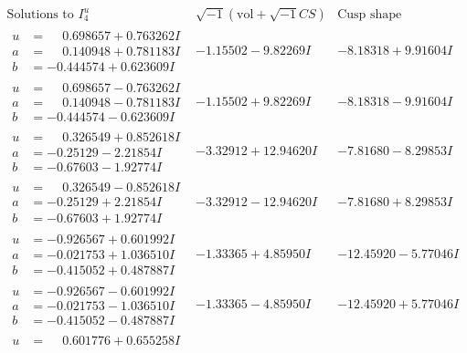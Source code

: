 \documentclass[1p]{elsarticle_modified}
\theoremstyle{definition}
\newcommand{\I}{\sqrt{-1}}
\begin{document}
$$\begin{array}{c|c|c}  
\text{Solutions to }I^u_{4}& \I (\text{vol} + \sqrt{-1}CS) & \text{Cusp shape}\\
 \hline 
\begin{aligned}
u &= \phantom{-}0.698657 + 0.763262 I \\
a &= \phantom{-}0.140948 + 0.781183 I \\
b &= -0.444574 + 0.623609 I\end{aligned}
 & -1.15502 - 9.82269 I & -8.18318 + 9.91604 I \\ \hline\begin{aligned}
u &= \phantom{-}0.698657 - 0.763262 I \\
a &= \phantom{-}0.140948 - 0.781183 I \\
b &= -0.444574 - 0.623609 I\end{aligned}
 & -1.15502 + 9.82269 I & -8.18318 - 9.91604 I \\ \hline\begin{aligned}
u &= \phantom{-}0.326549 + 0.852618 I \\
a &= -0.25129 - 2.21854 I \\
b &= -0.67603 - 1.92774 I\end{aligned}
 & -3.32912 + 12.94620 I & -7.81680 - 8.29853 I \\ \hline\begin{aligned}
u &= \phantom{-}0.326549 - 0.852618 I \\
a &= -0.25129 + 2.21854 I \\
b &= -0.67603 + 1.92774 I\end{aligned}
 & -3.32912 - 12.94620 I & -7.81680 + 8.29853 I \\ \hline\begin{aligned}
u &= -0.926567 + 0.601992 I \\
a &= -0.021753 + 1.036510 I \\
b &= -0.415052 + 0.487887 I\end{aligned}
 & -1.33365 + 4.85950 I & -12.45920 - 5.77046 I \\ \hline\begin{aligned}
u &= -0.926567 - 0.601992 I \\
a &= -0.021753 - 1.036510 I \\
b &= -0.415052 - 0.487887 I\end{aligned}
 & -1.33365 - 4.85950 I & -12.45920 + 5.77046 I \\ \hline\begin{aligned}
u &= \phantom{-}0.601776 + 0.655258 I \\

\end{aligned}
\end{array}$$
\end{document}
